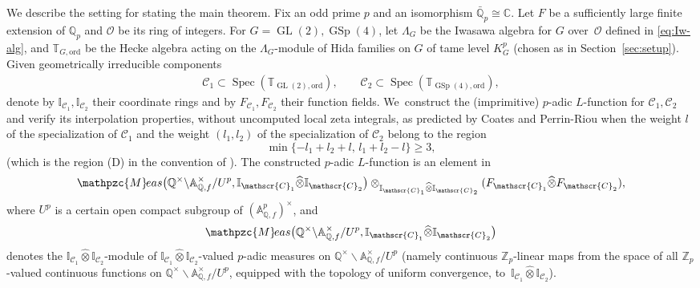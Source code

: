 \documentclass[JEP,XML,SOM,Unicode,published]{cedram}
\newcommand{\Lfunction}{$L$\nobreakdash-func\-tion\xspace}
\theoremstyle{plain}
\theoremstyle{remark}
\newcommand{\bA}{\mathbb{A}}
\newcommand{\bC}{\mathbb{C}}
\newcommand{\bI}{\mathbb{I}}
\newcommand{\bQ}{\mathbb{Q}}
\newcommand{\bT}{\mathbb{T}}
\newcommand{\bZ}{\mathbb{Z}}
\newcommand{\cO}{\mathcal{O}}
\newcommand{\sC}{\mathscr{C}}
\DeclareMathOperator{\GL}{GL}
\DeclareMathOperator{\GSp}{GSp}
\newcommand{\Meas}{\mathpzc{M}\mkern-2mu eas}
\newcommand{\ord}{\mathrm{ord}}
\DeclareMathOperator{\Spec}{Spec}
\let\wh\widehat
\begin{document}
We describe the setting for stating the main theorem. Fix an odd prime $p$ and an isomorphism $\bar{\bQ}_p\cong\bC$. Let $F$ be a sufficiently large finite extension of $\bQ_p$ and $\cO$ be its ring of integers. For $G=\GL(2),\GSp(4)$, let $\Lambda_G$ be the Iwasawa algebra for $G$ over~$\cO$ defined in \eqref{eq:Iw-alg}, and $\bT_{G,\ord}$ be the Hecke algebra acting on the $\Lambda_G$-module of Hida families on $G$ of tame level $K^p_G$ (chosen as in Section~\ref{sec:setup}). Given geometrically irreducible components
\begin{align*}
\sC_1\subset \Spec(\bT_{\GL(2),\ord}),
\qquad\sC_2\subset\Spec(\bT_{\GSp(4),\ord}),
\end{align*}
denote by $\bI_{\sC_1},\bI_{\sC_2}$ their coordinate rings and by $F_{\sC_1},F_{\sC_2}$ their function fields. We~construct the (imprimitive) $p$-adic \Lfunction for $\sC_1,\sC_2$ and verify its interpolation properties, without uncomputed local zeta integrals, as predicted by Coates and Perrin-Riou \cite{CoPerrin,Coates} when the weight $l$ of the specialization of $\sC_1$ and the weight $(l_1,l_2)$ of the specialization of $\sC_2$ belong to the region
\begin{equation}\label{eq:wt-region}
\min\{-l_1+l_2+l,\,l_1+l_2-l\}\geq 3,
\end{equation}
(which is the region (D) in the convention of \cite{LoRi}). The constructed $p$-adic \Lfunction is an element in
\[
\Meas\bigl(\bQ^\times\backslash\bA^\times_{\bQ,f}/U^p,\bI_{\sC_1}\wh{\otimes}\bI_{\sC_2}\bigr)\otimes_{\bI_{\sC_1}\wh{\otimes}\bI_{\sC_2}} (F_{\sC_1}\wh{\otimes}F_{\sC_2}),
\]
where $U^p$ is a certain open compact subgroup of $(\bA^p_{\bQ,f})^\times$, and
\[
\Meas\bigl(\bQ^\times\backslash\bA^\times_{\bQ,f}/U^p,\bI_{\sC_1}\wh{\otimes}\bI_{\sC_2}\bigr)
\]
denotes the $\bI_{\sC_1}\wh{\otimes}\bI_{\sC_2}$-module of $\bI_{\sC_1}\wh{\otimes}\bI_{\sC_2}$-valued $p$-adic measures on $\bQ^\times\backslash\bA^\times_{\bQ,f}/U^p$ (namely continuous $\bZ_p$-linear maps from the space of all $\bZ_p$-valued continuous functions on $\bQ^\times\backslash\bA^\times_{\bQ,f}/U^p$, equipped with the topology of uniform convergence, to~$\bI_{\sC_1}\wh{\otimes}\bI_{\sC_2}$).
\end{document}
